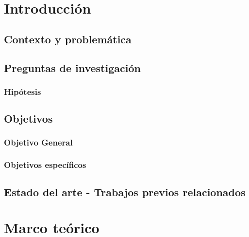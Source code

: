 \documentclass[10pt,letterpaper,final]{report}
\newlength{\spacing}
\newcommand{\nspace}[1]{\setlength{\baselineskip}{#1\spacing}}
\newenvironment{linespacing}[1]{\nspace{#1}}{}
\begin{document}
\begin{linespacing}{1.5}

\chapter{Introducción}


\section{Contexto y problemática}


\section{Preguntas de investigación}


\subsection{Hipótesis}


\section{Objetivos}
\subsection{Objetivo General}

\subsection{Objetivos específicos}


\section{Estado del arte - Trabajos previos relacionados}


% 

\clearpage
\chapter{Marco teórico}\label{chap:marco-teorico}



\end{linespacing}
\end{document}
